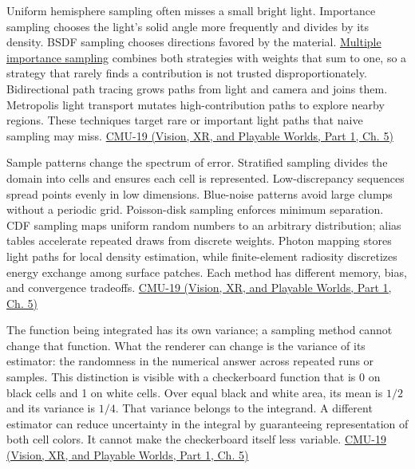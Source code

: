 Uniform hemisphere sampling often misses a small bright light. Importance sampling chooses the light's solid angle more frequently and divides by its density. BSDF sampling chooses directions favored by the material. \hyperref[appendix-031e02bf28af]{Multiple importance sampling} combines both strategies with weights that sum to one, so a strategy that rarely finds a contribution is not trusted disproportionately. Bidirectional path tracing grows paths from light and camera and joins them. Metropolis light transport mutates high-contribution paths to explore nearby regions. These techniques target rare or important light paths that naive sampling may miss. \href{../07-Vision-XR-and-Playable-Worlds-P01/main.pdf\#nameddest=04-visual-computing-ii-ch036-cmu-19---variance-reduction}{CMU-19 (Vision, XR, and Playable Worlds, Part 1, Ch. 5)}

Sample patterns change the spectrum of error. Stratified sampling divides the domain into cells and ensures each cell is represented. Low-discrepancy sequences spread points evenly in low dimensions. Blue-noise patterns avoid large clumps without a periodic grid. Poisson-disk sampling enforces minimum separation. CDF sampling maps uniform random numbers to an arbitrary distribution; alias tables accelerate repeated draws from discrete weights. Photon mapping stores light paths for local density estimation, while finite-element radiosity discretizes energy exchange among surface patches. Each method has different memory, bias, and convergence tradeoffs. \href{../07-Vision-XR-and-Playable-Worlds-P01/main.pdf\#nameddest=04-visual-computing-ii-ch036-cmu-19---variance-reduction}{CMU-19 (Vision, XR, and Playable Worlds, Part 1, Ch. 5)}

The function being integrated has its own variance; a sampling method cannot change that function. What the renderer can change is the variance of its estimator: the randomness in the numerical answer across repeated runs or samples. This distinction is visible with a checkerboard function that is 0 on black cells and 1 on white cells. Over equal black and white area, its mean is \(1/2\) and its variance is \(1/4\). That variance belongs to the integrand. A different estimator can reduce uncertainty in the integral by guaranteeing representation of both cell colors. It cannot make the checkerboard itself less variable. \href{../07-Vision-XR-and-Playable-Worlds-P01/main.pdf\#nameddest=04-visual-computing-ii-ch036-cmu-19---variance-reduction}{CMU-19 (Vision, XR, and Playable Worlds, Part 1, Ch. 5)}

